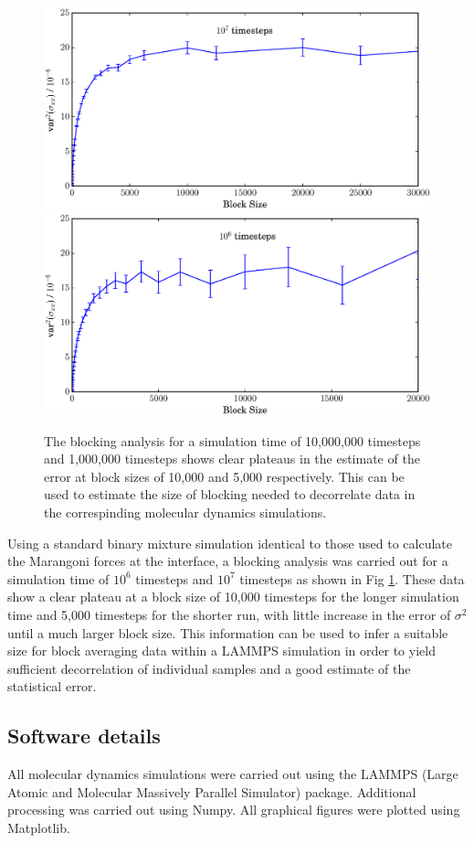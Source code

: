 \begin{figure}
        \includegraphics[scale=0.35]{block_average_10e6.eps}
        \includegraphics[scale=0.35]{block_average_1e6.eps}
	\caption{The blocking analysis for a simulation time of 10,000,000 timesteps and 1,000,000 timesteps shows clear plateaus in the estimate of the error at block sizes of 10,000 and 5,000 respectively.
This can be used to estimate the size of blocking needed to decorrelate data in the correspinding molecular dynamics simulations.}
\label{blocking}
\end{figure}

Using a standard binary mixture simulation identical to those used to calculate the Marangoni forces at the interface, a blocking analysis was carried out for a simulation time of $10^{6}$ timesteps and $10^{7}$ timesteps as shown in Fig \ref{blocking}.
These data show a clear plateau at a block size of 10,000 timesteps for the longer simulation time and 5,000 timesteps for the shorter run, with little increase in the error of $\sigma^{2}$ until a much larger block size.
This information can be used to infer a suitable size for block averaging data within a LAMMPS simulation in order to yield sufficient decorrelation of individual samples and a good estimate of the statistical error. 


\subsection{Software details}
All molecular dynamics simulations were carried out using the LAMMPS (Large Atomic and Molecular Massively Parallel Simulator) package.\cite{LAMMPS}
Additional processing was carried out using Numpy.\cite{NumPy}
All graphical figures were plotted using Matplotlib.\cite{MatPlotLib}

